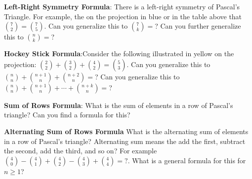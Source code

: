 \documentclass[11pt]{amsart}
\begin{document}
{\bf Left-Right Symmetry Formula}: There is a left-right symmetry of Pascal's Triangle. For example, the on the projection in blue or in the table above that $\binom{7}{2}=\binom{7}{5}$.  Can you generalize this to $\binom{7}{k}=$? Can you further generalize this to $\binom{n}{k}=$?\vspace{.25cm}

{\bf Hockey Stick Formula}:Consider the following illustrated in yellow on the projection: $\binom{2}{2}+\binom{3}{2}+\binom{4}{2}=\binom{5}{3}$. Can you generalize this to $\binom{n}{n}+\binom{n+1}{n}+\binom{n+2}{n}=$?
Can you generalize this to $\binom{n}{n}+\binom{n+1}{n}+\cdots +\binom{n+k}{n}=$? \vspace{.25cm}

{\bf Sum of Rows Formula}: What is the sum of elements in a row of Pascal's triangle?  Can you find a formula for this? \vspace{.25cm}

{\bf Alternating Sum of Rows Formula} What is the alternating sum of elements in a row of Pascal's triangle?  Alternating sum means the add the first, subtract the second, add the third, and so on?  For example $\binom{4}{0}-\binom{4}{1}+\binom{4}{2}-\binom{4}{3}+\binom{4}{4}=?$. What is a general formula for this for $n\ge 1$?
\end{document}
